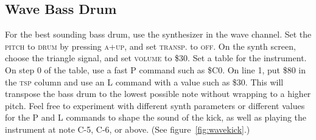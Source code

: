 \subsection{Wave Bass Drum}

For the best sounding bass drum, use the synthesizer in the wave channel. Set the \textsc{pitch} to \textsc{drum} by pressing \textsc{a+up}, and set \textsc{transp.} to \textsc{off}. On the synth screen, choose the triangle signal, and set \textsc{volume} to \$30. Set a table for the instrument. On step 0 of the table, use a fast P command such as \$C0. On line 1, put \$80 in the \textsc{tsp} column and use an L command with a value such as \$30. This will transpose the bass drum to the lowest possible note without wrapping to a higher pitch.  Feel free to experiment with different synth parameters or different values for the P and L commands to shape the sound of the kick, as well as playing the instrument at note C-5, C-6, or above. (See figure~\ref{fig:wavekick}.)

